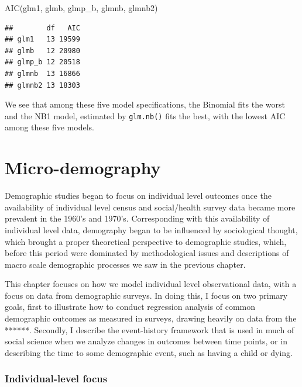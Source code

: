 \documentclass[
]{article}
\newenvironment{Shaded}{\begin{snugshade}}{\end{snugshade}}
\newcommand{\FunctionTok}[1]{\textcolor[rgb]{0.00,0.00,0.00}{#1}}
\newcommand{\NormalTok}[1]{#1}
\begin{document}
\begin{Shaded}
\begin{Highlighting}[]
\FunctionTok{AIC}\NormalTok{(glm1, glmb, glmp\_b, glmnb, glmnb2)}
\end{Highlighting}
\end{Shaded}

\begin{verbatim}
##        df   AIC
## glm1   13 19599
## glmb   12 20980
## glmp_b 12 20518
## glmnb  13 16866
## glmnb2 13 18303
\end{verbatim}

We see that among these five model specifications, the Binomial fits the worst and the NB1 model, estimated by \texttt{glm.nb()} fits the best, with the lowest AIC among these five models.

\newpage

\hypertarget{micro-demography}{%
\section{Micro-demography}\label{micro-demography}}

Demographic studies began to focus on individual level outcomes once the availability of individual level census and social/health survey data became more prevalent in the 1960's and 1970's. Corresponding with this availability of individual level data, demography began to be influenced by sociological thought, which brought a proper theoretical perspective to demographic studies, which, before this period were dominated by methodological issues and descriptions of macro scale demographic processes we saw in the previous chapter.

This chapter focuses on how we model individual level observational data, with a focus on data from demographic surveys. In doing this, I focus on two primary goals, first to illustrate how to conduct regression analysis of common demographic outcomes as measured in surveys, drawing heavily on data from the ******. Secondly, I describe the event-history framework that is used in much of social science when we analyze changes in outcomes between time points, or in describing the time to some demographic event, such as having a child or dying.

\hypertarget{individual-level-focus}{%
\subsubsection{Individual-level focus}\label{individual-level-focus}}
\end{document}
